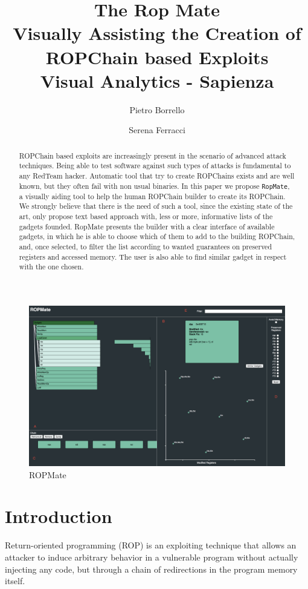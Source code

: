 \documentclass[twocolumn, 11pt]{article}
\title{{\Large \bf The Rop Mate \\ \large Visually Assisting the Creation of ROPChain based Exploits}  \\{\medskip\normalfont\normalsize  Visual Analytics -  Sapienza}}
\author{
{\rm Pietro Borrello}
\and
{\rm Serena Ferracci}}
\date{}
\begin{document}
    \maketitle
    \begin{figure}[htb]
      \centering
      \includegraphics[width=0.6\linewidth]{ropmate-screen}
      \caption{ROPMate}\label{fig:ropmate}
    \end{figure}

\begin{abstract}

ROPChain based exploits are increasingly present in the scenario of advanced attack techniques.
Being able to test software against such types of attacks is fundamental to any RedTeam hacker. Automatic tool that try to create ROPChains exists and are well known, but they often fail with non usual binaries.
In this paper we propose \texttt{RopMate}, a visually aiding tool to help the human ROPChain builder to create its ROPChain. We strongly believe that there is the need of such a tool, since the existing state of the art, only propose text based approach with, less or more, informative lists of the gadgets founded.
RopMate presents the builder with a clear interface of available gadgets, in which he is able to choose which of them to add to the building ROPChain, and, once selected, to filter the list according to wanted guarantees on preserved registers and accessed memory. The user is also able to find similar gadget in respect with the one chosen.
\end{abstract}

\twocolumn
\section{Introduction}
Return-oriented programming (ROP) is an exploiting technique that allows an attacker to induce arbitrary behavior in a vulnerable program without actually injecting any code, but through a chain of redirections in the program memory itself. \cite{rop}
\end{document}
